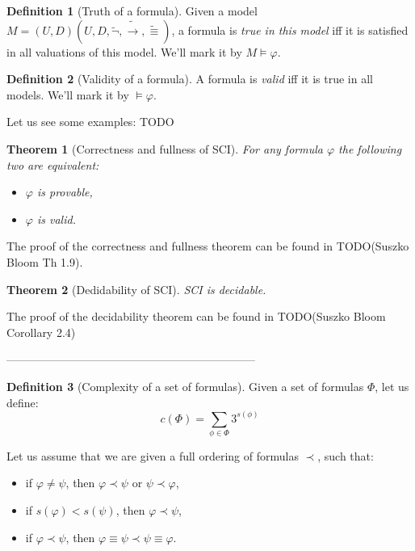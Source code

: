 \documentclass{article}
\newtheorem{theorem}{Theorem}
\theoremstyle{definition}
\newtheorem{definition}{Definition}[section]
\newcommand*{\id}{\equiv}
\newcommand*{\ra}{\rightarrow}
\begin{document}
\begin{definition}[Truth of a formula]
    Given a model $M = (U, D)(U, D, \tilde{\lnot}, \tilde{\ra}, \tilde{\id})$, a formula is \emph{true in this model} iff it is satisfied in all valuations of this model. We'll mark it by $M \models \varphi$.
\end{definition}

\begin{definition}[Validity of a formula]
    A formula is \emph{valid} iff it is true in all models. We'll mark it by $ \models \varphi$.
\end{definition}

Let us see some examples:
TODO

\begin{theorem}[Correctness and fullness of SCI]
    For any formula $\varphi$ the following two are equivalent:
    \begin{itemize}
        \item $\varphi$ is provable,
        \item $\varphi$ is valid.
    \end{itemize}
\end{theorem}

The proof of the correctness and fullness theorem can be found in TODO(Suszko Bloom Th 1.9).

\begin{theorem}[Dedidability of SCI]
    SCI is decidable.
\end{theorem}

The proof of the decidability theorem can be found in TODO(Suszko Bloom Corollary 2.4)

------------------------------------------------------------------


\begin{definition}[Complexity of a set of formulas]
    Given a set of formulas $\Phi$, let us define:
    $$
        c(\Phi) = \sum_{\phi \in \Phi} 3^{s(\phi)}
    $$
\end{definition}

Let us assume that we are given a full ordering of formulas $\prec$, such that:
\begin{itemize}
    \item if $\varphi \not = \psi$, then $\varphi \prec \psi$ or $\psi \prec \varphi$,
    \item if $s(\varphi) < s(\psi)$, then $\varphi \prec \psi$,
    \item if $\varphi \prec \psi$, then $\varphi \id \psi \prec \psi \id \varphi$.
\end{itemize}
\end{document}
